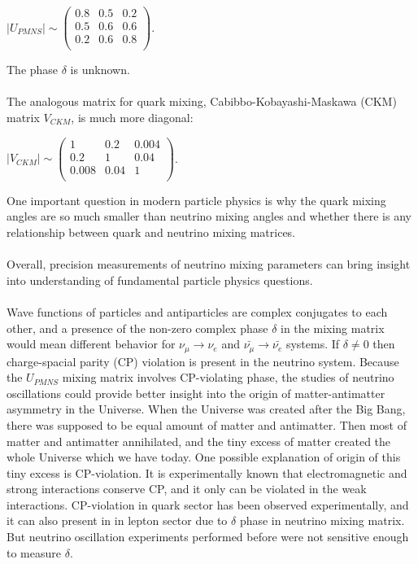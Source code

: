 \begin{center}
$|U_{PMNS}| \sim
 \begin{pmatrix}
  0.8 & 0.5 & 0.2 \\ 0.5 & 0.6 & 0.6 \\ 0.2 & 0.6 & 0.8 \\
 \end{pmatrix}$.\\
\end{center}
The phase $\delta$ is unknown.\\ \\
The analogous matrix for quark mixing, Cabibbo-Kobayashi-Maskawa (CKM) matrix $V_{CKM}$, is much more diagonal:\\
\begin{center}
$|V_{CKM}| \sim
 \begin{pmatrix}
  1 & 0.2 & 0.004 \\ 0.2 & 1 & 0.04 \\ 0.008 & 0.04 & 1 \\
 \end{pmatrix}$.\\
\end{center}
One important question in modern particle physics is why the quark mixing angles are so much smaller than neutrino mixing angles and whether there is any relationship between quark and neutrino mixing matrices.\\ \\
Overall, precision measurements of neutrino mixing parameters can bring insight into understanding of fundamental particle physics questions.\\ \\
Wave functions of particles and antiparticles are complex conjugates to each other, and a presence of the non-zero complex phase $\delta$ in the mixing matrix would mean different behavior for $\nu_\mu \rightarrow \nu_e$ and $\bar{\nu_\mu} \rightarrow \bar{\nu_e}$ systems. If $\delta \neq 0$ then charge-spacial parity (CP) violation is present in the neutrino system. Because the $U_{PMNS}$ mixing matrix involves CP-violating phase, the studies of neutrino oscillations could provide better insight into the origin of matter-antimatter asymmetry in the Universe. When the Universe was created after the Big Bang, there was supposed to be equal amount of matter and antimatter. Then most of matter and antimatter annihilated, and the tiny excess of matter created the whole Universe which we have today. One possible explanation of origin of this tiny excess is CP-violation. It is experimentally known that electromagnetic and strong interactions conserve CP, and it only can be violated in the weak interactions. CP-violation in quark sector has been observed experimentally, and it can also present in in lepton sector due to $\delta$ phase in neutrino mixing matrix. But neutrino oscillation experiments performed before were not sensitive enough to measure $\delta$.\\ \\
